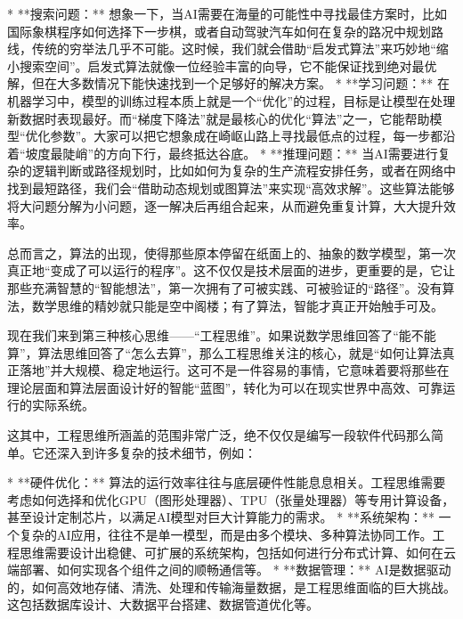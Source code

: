 *   **搜索问题：** 想象一下，当AI需要在海量的可能性中寻找最佳方案时，比如国际象棋程序如何选择下一步棋，或者自动驾驶汽车如何在复杂的路况中规划路线，传统的穷举法几乎不可能。这时候，我们就会借助“启发式算法”来巧妙地“缩小搜索空间”。启发式算法就像一位经验丰富的向导，它不能保证找到绝对最优解，但在大多数情况下能快速找到一个足够好的解决方案。
*   **学习问题：** 在机器学习中，模型的训练过程本质上就是一个“优化”的过程，目标是让模型在处理新数据时表现最好。而“梯度下降法”就是最核心的优化“算法”之一，它能帮助模型“优化参数”。大家可以把它想象成在崎岖山路上寻找最低点的过程，每一步都沿着“坡度最陡峭”的方向下行，最终抵达谷底。
*   **推理问题：** 当AI需要进行复杂的逻辑判断或路径规划时，比如如何为复杂的生产流程安排任务，或者在网络中找到最短路径，我们会“借助动态规划或图算法”来实现“高效求解”。这些算法能够将大问题分解为小问题，逐一解决后再组合起来，从而避免重复计算，大大提升效率。

总而言之，算法的出现，使得那些原本停留在纸面上的、抽象的数学模型，第一次真正地“变成了可以运行的程序”。这不仅仅是技术层面的进步，更重要的是，它让那些充满智慧的“智能想法”，第一次拥有了可被实践、可被验证的“路径”。没有算法，数学思维的精妙就只能是空中阁楼；有了算法，智能才真正开始触手可及。



现在我们来到第三种核心思维——“工程思维”。如果说数学思维回答了“能不能算”，算法思维回答了“怎么去算”，那么工程思维关注的核心，就是“如何让算法真正落地”并大规模、稳定地运行。这可不是一件容易的事情，它意味着要将那些在理论层面和算法层面设计好的智能“蓝图”，转化为可以在现实世界中高效、可靠运行的实际系统。

这其中，工程思维所涵盖的范围非常广泛，绝不仅仅是编写一段软件代码那么简单。它还深入到许多复杂的技术细节，例如：

*   **硬件优化：** 算法的运行效率往往与底层硬件性能息息相关。工程思维需要考虑如何选择和优化GPU（图形处理器）、TPU（张量处理器）等专用计算设备，甚至设计定制芯片，以满足AI模型对巨大计算能力的需求。
*   **系统架构：** 一个复杂的AI应用，往往不是单一模型，而是由多个模块、多种算法协同工作。工程思维需要设计出稳健、可扩展的系统架构，包括如何进行分布式计算、如何在云端部署、如何实现各个组件之间的顺畅通信等。
*   **数据管理：** AI是数据驱动的，如何高效地存储、清洗、处理和传输海量数据，是工程思维面临的巨大挑战。这包括数据库设计、大数据平台搭建、数据管道优化等。

